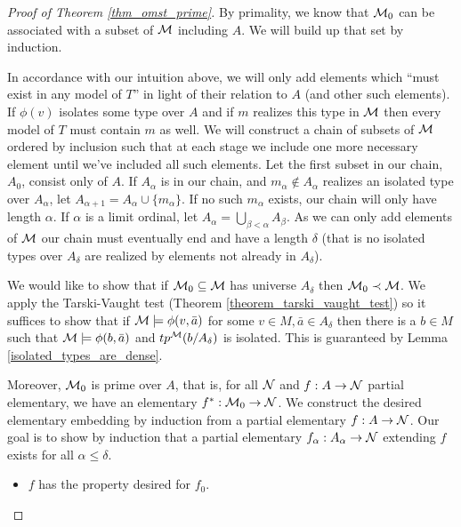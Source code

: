 \begin{proof}[Proof of Theorem \ref{thm_omst_prime}]\label{proof_omst_prime} 
By primality, we know that \(\mathcal{M}_0\) can be associated with a subset of \(\mathcal{M}\) including \(A\). 
We will build up that set by induction. 

In accordance with our intuition above, we will only add elements which ``must exist in any model of \(T\)'' in light of their relation to \(A\) (and other such elements).
If \(\phi(v)\) isolates some type over \(A\) and if \(m\) realizes this type in \(\mathcal{M}\) then every model of \(T\) must contain \(m\) as well. 
We will construct a chain of subsets of \(\mathcal{M}\) ordered by inclusion such that at each stage we include one more necessary element until we've included all such elements. 
Let the first subset in our chain, \(A_0\), consist only of \(A\). 
If \(A_\alpha\) is in our chain, and \(m_\alpha \notin A_\alpha\) realizes an isolated type over \(A_\alpha\), let \(A_{\alpha+1} = A_\alpha \cup \{m_\alpha\}\).
If no such \(m_\alpha\) exists, our chain will only have length \(\alpha\). 
If \(\alpha\) is a limit ordinal, let \(A_\alpha = \bigcup\limits_{\beta < \alpha} A_\beta\). 
As we can only add elements of \(\mathcal{M}\) our chain must eventually end and have a length \(\delta\) (that is no isolated types over \(A_\delta\) are realized by elements not already in \(A_\delta\)).

We would like to show that if \(\mathcal{M}_0 \subseteq \mathcal{M}\) has universe \(A_\delta\) then \(\mathcal{M}_0 \prec \mathcal{M}\).
We apply the Tarski-Vaught test (Theorem \ref{theorem_tarski_vaught_test}) so it suffices to show that if \(\mathcal{M} \models \phi(v, \bar{a})\) for some \(v \in M, \bar{a} \in A_\delta\) then there is a \(b \in M\) such that \(\mathcal{M} \models \phi(b, \bar{a})\) and \(tp^{\mathcal{M}}(b/A_\delta)\) is isolated. 
This is guaranteed by Lemma \ref{isolated_types_are_dense}.

Moreover, \(\mathcal{M}_0\) is prime over \(A\), that is, for all \(\mathcal{N}\) and \(f: A \to \mathcal{N}\) partial elementary, we have an elementary \(f^*: \mathcal{M}_0 \to \mathcal{N}\). 
We construct the desired elementary embedding by induction from a partial elementary \(f: A \to \mathcal{N}\).  
Our goal is to show by induction that a partial elementary \(f_\alpha:A_\alpha \to \mathcal{N}\) extending \(f\) exists for all \(\alpha \leq \delta\). 

\begin{itemize}
\item \(f\) has the property desired for \(f_0\). 


\end{itemize}
\end{proof}
